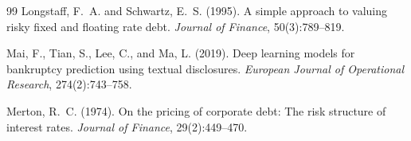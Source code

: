 \documentclass[12pt, a4paper]{article}
\theoremstyle{definition}
\begin{document}
\begin{thebibliography}{99}
Longstaff, F.~A. and Schwartz, E.~S. (1995).
A simple approach to valuing risky fixed and floating rate debt.
\textit{Journal of Finance}, 50(3):789--819.

Mai, F., Tian, S., Lee, C., and Ma, L. (2019).
Deep learning models for bankruptcy prediction using textual disclosures.
\textit{European Journal of Operational Research}, 274(2):743--758.

Merton, R.~C. (1974).
On the pricing of corporate debt: The risk structure of interest rates.
\textit{Journal of Finance}, 29(2):449--470.

\end{thebibliography}
\end{document}
